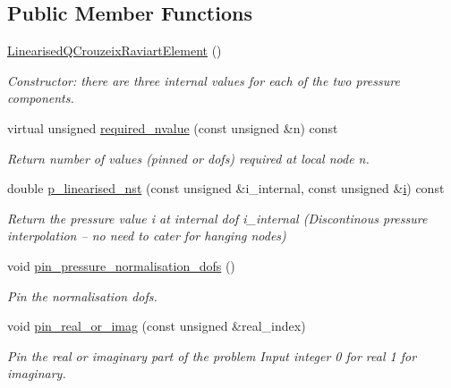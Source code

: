 \subsection*{Public Member Functions}
\begin{DoxyCompactItemize}
\item 
\hyperlink{classoomph_1_1LinearisedQCrouzeixRaviartElement_a378e48adcb578e79cd8a62cc0572f2a3}{Linearised\+Q\+Crouzeix\+Raviart\+Element} ()
\begin{DoxyCompactList}\small\item\em Constructor\+: there are three internal values for each of the two pressure components. \end{DoxyCompactList}\item 
virtual unsigned \hyperlink{classoomph_1_1LinearisedQCrouzeixRaviartElement_afe21c0edebd508c2d88b515d18329727}{required\+\_\+nvalue} (const unsigned \&n) const
\begin{DoxyCompactList}\small\item\em Return number of values (pinned or dofs) required at local node n. \end{DoxyCompactList}\item 
double \hyperlink{classoomph_1_1LinearisedQCrouzeixRaviartElement_a249f8ab0e96abdabb3f60488386ba55d}{p\+\_\+linearised\+\_\+nst} (const unsigned \&i\+\_\+internal, const unsigned \&\hyperlink{cfortran_8h_adb50e893b86b3e55e751a42eab3cba82}{i}) const
\begin{DoxyCompactList}\small\item\em Return the pressure value i at internal dof i\+\_\+internal (Discontinous pressure interpolation -- no need to cater for hanging nodes) \end{DoxyCompactList}\item 
void \hyperlink{classoomph_1_1LinearisedQCrouzeixRaviartElement_ae0a83b6da9fd010ced94a576d8c3a997}{pin\+\_\+pressure\+\_\+normalisation\+\_\+dofs} ()
\begin{DoxyCompactList}\small\item\em Pin the normalisation dofs. \end{DoxyCompactList}\item 
void \hyperlink{classoomph_1_1LinearisedQCrouzeixRaviartElement_ab6ffe74e04be87be8e1fdf6a58215edb}{pin\+\_\+real\+\_\+or\+\_\+imag} (const unsigned \&real\+\_\+index)
\begin{DoxyCompactList}\small\item\em Pin the real or imaginary part of the problem Input integer 0 for real 1 for imaginary. \end{DoxyCompactList}\item 

\end{DoxyCompactItemize}
